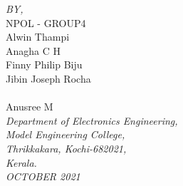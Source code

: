 \documentclass[10pt]{report}
\begin{document}
\begin{titlepage}
\Large \emph{BY,}\\

NPOL - GROUP4\\[0.5CM]
\centering
Alwin Thampi\\
\centering
Anagha C H\\
\centering
Finny Philip Biju\\
\centering
Jibin Joseph Rocha\\ \\
\centering
Anusree M\\[1.5cm]


\large \emph{Department of Electronics Engineering, \\
Model Engineering College, \\ Thrikkakara,
Kochi-682021,\\  Kerala.}
\\[0.5cm] %

\Large \emph{OCTOBER 2021}

\vfill %

\end{titlepage}










\newpage


\clearpage


\fontsize{12}{12}\selectfont 
\newpage
\thispagestyle{empty}
 
\thispagestyle{empty}
\tableofcontents
\thispagestyle{empty}
\listoffigures
{} 
\end{document}
